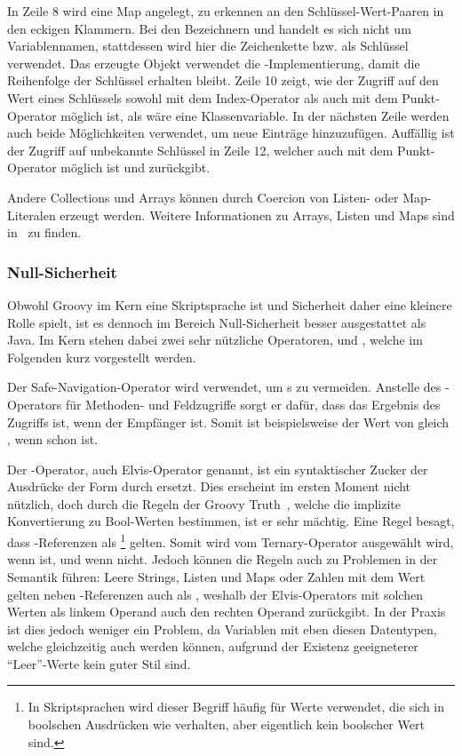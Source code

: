 In Zeile 8 wird eine Map angelegt, zu erkennen an den Schlüssel-Wert-Paaren in den eckigen Klammern.
Bei den Bezeichnern  und  handelt es sich nicht um Variablennamen, stattdessen wird hier die Zeichenkette  bzw.  als Schlüssel verwendet.
Das erzeugte Objekt verwendet die -Implementierung, damit die Reihenfolge der Schlüssel erhalten bleibt.
Zeile 10 zeigt, wie der Zugriff auf den Wert eines Schlüssels sowohl mit dem Index-Operator als auch mit dem Punkt-Operator möglich ist, als wäre  eine Klassenvariable.
In der nächsten Zeile werden auch beide Möglichkeiten verwendet, um neue Einträge hinzuzufügen.
Auffällig ist der Zugriff auf unbekannte Schlüssel in Zeile 12, welcher auch mit dem Punkt-Operator möglich ist und  zurückgibt.

Andere Collections und Arrays können durch Coercion von Listen- oder Map-Literalen erzeugt werden.
Weitere Informationen zu Arrays, Listen und Maps sind in~\cite[{Abs.} 7.-9.]{groovy-lang:syntax} zu finden.

\subsubsection{Null-Sicherheit}

Obwohl Groovy im Kern eine Skriptsprache ist und Sicherheit daher eine kleinere Rolle spielt, ist es dennoch im Bereich Null-Sicherheit besser ausgestattet als Java.
Im Kern stehen dabei zwei sehr nützliche Operatoren,  und , welche im Folgenden kurz vorgestellt werden.

Der Safe-Navigation-Operator  wird verwendet, um s zu vermeiden.
Anstelle des -Operators für Methoden- und Feldzugriffe sorgt er dafür, dass das Ergebnis des Zugriffs  ist, wenn der Empfänger  ist.
Somit ist beispielsweise der Wert von  gleich , wenn  schon  ist.

Der -Operator, auch Elvis-Operator genannt, ist ein syntaktischer Zucker der Ausdrücke der Form  durch  ersetzt.
Dies erscheint im ersten Moment nicht nützlich, doch durch die Regeln der Groovy Truth~\cite[{Abs.} 5.]{groovy-lang:semantics}, welche die implizite Konvertierung zu Bool-Werten bestimmen, ist er sehr mächtig.
Eine Regel besagt, dass -Referenzen als \footnote{In Skriptsprachen wird dieser Begriff häufig für Werte verwendet, die sich in boolschen Ausdrücken wie  verhalten, aber eigentlich kein boolscher Wert sind.} gelten.
Somit wird  vom Ternary-Operator ausgewählt wird, wenn   ist, und  wenn nicht.
Jedoch können die Regeln auch zu Problemen in der Semantik führen:
Leere Strings, Listen und Maps oder Zahlen mit dem Wert  gelten neben -Referenzen auch als , weshalb der Elvis-Operators mit solchen Werten als linkem Operand auch den rechten Operand zurückgibt.
In der Praxis ist dies jedoch weniger ein Problem, da Variablen mit eben diesen Datentypen, welche gleichzeitig auch  werden können, aufgrund der Existenz geeigneterer ``Leer''-Werte kein guter Stil sind.


